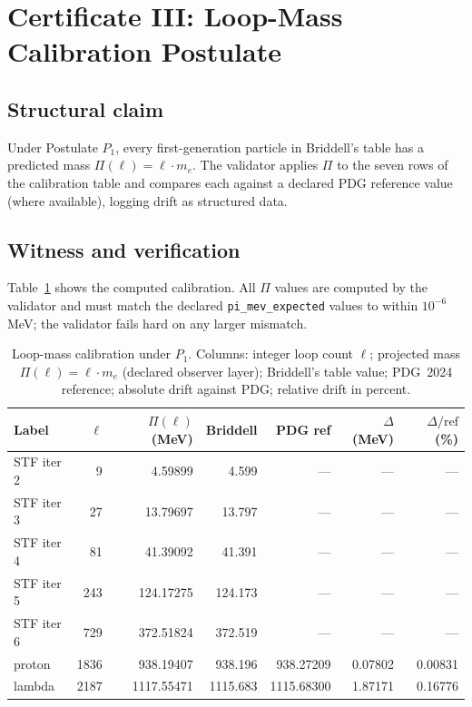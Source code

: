\documentclass[12pt,a4paper]{article}
\begin{document}
\section{Certificate III: Loop-Mass Calibration Postulate}
\label{sec:cert3}

\subsection{Structural claim}

Under Postulate $P_1$, every first-generation particle in Briddell's
table has a predicted mass $\Pi(\ell) = \ell \cdot m_e$. The
validator applies $\Pi$ to the seven rows of the calibration table
and compares each against a declared PDG reference value (where
available), logging drift as structured data.

\subsection{Witness and verification}

Table~\ref{tab:calibration} shows the computed calibration. All
$\Pi$ values are computed by the validator and must match the
declared \texttt{pi\_mev\_expected} values to within $10^{-6}$
MeV; the validator fails hard on any larger mismatch.

\begin{table}[h]
\centering
\caption{Loop-mass calibration under $P_1$. Columns: integer loop
count $\ell$; projected mass $\Pi(\ell) = \ell \cdot m_e$ (declared
observer layer); Briddell's table value; PDG~2024 reference;
absolute drift against PDG; relative drift in percent.}
\label{tab:calibration}
\small
\begin{tabular}{@{}lrrrrrr@{}}
\toprule
Label     & $\ell$ & $\Pi(\ell)$ (MeV) & Briddell & PDG ref   & $\Delta$ (MeV) & $\Delta/\text{ref}$ (\%) \\
\midrule
STF iter 2 &    9 &    4.59899 &    4.599 & ---         & ---      & ---     \\
STF iter 3 &   27 &   13.79697 &   13.797 & ---         & ---      & ---     \\
STF iter 4 &   81 &   41.39092 &   41.391 & ---         & ---      & ---     \\
STF iter 5 &  243 &  124.17275 &  124.173 & ---         & ---      & ---     \\
STF iter 6 &  729 &  372.51824 &  372.519 & ---         & ---      & ---     \\
proton     & 1836 &  938.19407 &  938.196 & 938.27209   & 0.07802  & 0.00831 \\
lambda     & 2187 & 1117.55471 & 1115.683 & 1115.68300  & 1.87171  & 0.16776 \\
\bottomrule
\end{tabular}
\end{table}
\end{document}
